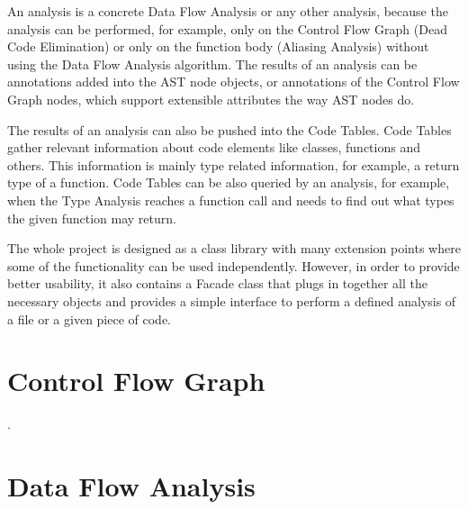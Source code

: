     An analysis is a concrete Data Flow Analysis or any 
    other analysis, because the analysis can be 
    performed, for example, only on the Control Flow Graph 
    (Dead Code Elimination) 
    or only on the function body (Aliasing Analysis) 
    without using the Data Flow Analysis algorithm. 
    The results of an analysis can be annotations added 
    into the AST node objects, or annotations of the Control Flow Graph 
    nodes, which support extensible attributes the way AST nodes do. 
    
    The results of an analysis can also be pushed into 
    the Code Tables. Code Tables gather relevant information about 
    code elements like classes, functions and others. 
    This information is mainly type related information, 
    for example, a return type of a function. Code Tables can 
    be also queried by an analysis, for example, when 
    the Type Analysis reaches a function call and needs to 
    find out what types the given function may return.
    
    The whole project is designed as a class library with 
    many extension points where some of the functionality 
    can be used independently. 
    However, in order to provide better usability, 
    it also contains a Facade class  
    that plugs in together all the necessary objects 
    and provides a simple interface to perform a defined 
    analysis of a file or a given piece of code.    
    
    \section{Control Flow Graph}
        .
        
    \section{Data Flow Analysis}
        
